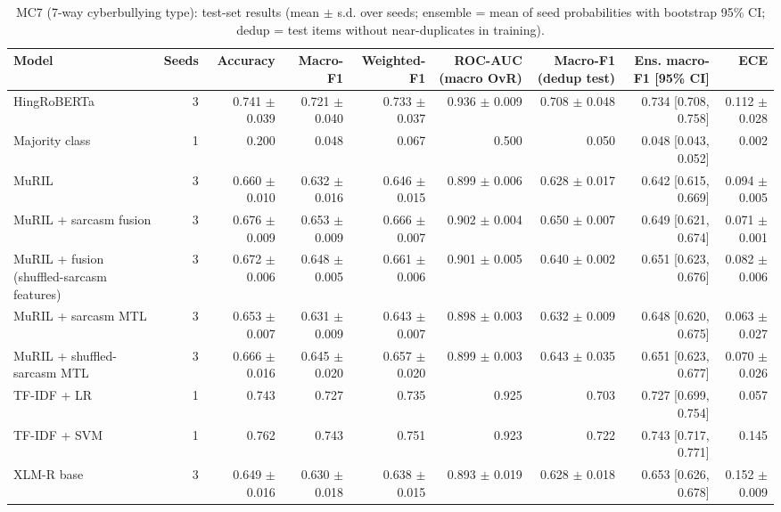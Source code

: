 \begin{table}[t]
\centering
\small
\caption{MC7 (7-way cyberbullying type): test-set results (mean $\pm$ s.d. over seeds; ensemble = mean of seed probabilities with bootstrap 95\% CI; dedup = test items without near-duplicates in training).}
\label{tab:tab05_results_mc7}
\begin{tabular}{lrrrrrrrr}
\toprule
Model & Seeds & Accuracy & Macro-F1 & Weighted-F1 & ROC-AUC (macro OvR) & Macro-F1 (dedup test) & Ens. macro-F1 [95\% CI] & ECE \\
\midrule
HingRoBERTa & 3 & 0.741 $\pm$ 0.039 & 0.721 $\pm$ 0.040 & 0.733 $\pm$ 0.037 & 0.936 $\pm$ 0.009 & 0.708 $\pm$ 0.048 & 0.734 [0.708, 0.758] & 0.112 $\pm$ 0.028 \\
Majority class & 1 & 0.200 & 0.048 & 0.067 & 0.500 & 0.050 & 0.048 [0.043, 0.052] & 0.002 \\
MuRIL & 3 & 0.660 $\pm$ 0.010 & 0.632 $\pm$ 0.016 & 0.646 $\pm$ 0.015 & 0.899 $\pm$ 0.006 & 0.628 $\pm$ 0.017 & 0.642 [0.615, 0.669] & 0.094 $\pm$ 0.005 \\
MuRIL + sarcasm fusion & 3 & 0.676 $\pm$ 0.009 & 0.653 $\pm$ 0.009 & 0.666 $\pm$ 0.007 & 0.902 $\pm$ 0.004 & 0.650 $\pm$ 0.007 & 0.649 [0.621, 0.674] & 0.071 $\pm$ 0.001 \\
MuRIL + fusion (shuffled-sarcasm features) & 3 & 0.672 $\pm$ 0.006 & 0.648 $\pm$ 0.005 & 0.661 $\pm$ 0.006 & 0.901 $\pm$ 0.005 & 0.640 $\pm$ 0.002 & 0.651 [0.623, 0.676] & 0.082 $\pm$ 0.006 \\
MuRIL + sarcasm MTL & 3 & 0.653 $\pm$ 0.007 & 0.631 $\pm$ 0.009 & 0.643 $\pm$ 0.007 & 0.898 $\pm$ 0.003 & 0.632 $\pm$ 0.009 & 0.648 [0.620, 0.675] & 0.063 $\pm$ 0.027 \\
MuRIL + shuffled-sarcasm MTL & 3 & 0.666 $\pm$ 0.016 & 0.645 $\pm$ 0.020 & 0.657 $\pm$ 0.020 & 0.899 $\pm$ 0.003 & 0.643 $\pm$ 0.035 & 0.651 [0.623, 0.677] & 0.070 $\pm$ 0.026 \\
TF-IDF + LR & 1 & 0.743 & 0.727 & 0.735 & 0.925 & 0.703 & 0.727 [0.699, 0.754] & 0.057 \\
TF-IDF + SVM & 1 & 0.762 & 0.743 & 0.751 & 0.923 & 0.722 & 0.743 [0.717, 0.771] & 0.145 \\
XLM-R base & 3 & 0.649 $\pm$ 0.016 & 0.630 $\pm$ 0.018 & 0.638 $\pm$ 0.015 & 0.893 $\pm$ 0.019 & 0.628 $\pm$ 0.018 & 0.653 [0.626, 0.678] & 0.152 $\pm$ 0.009 \\
\bottomrule
\end{tabular}
\end{table}
